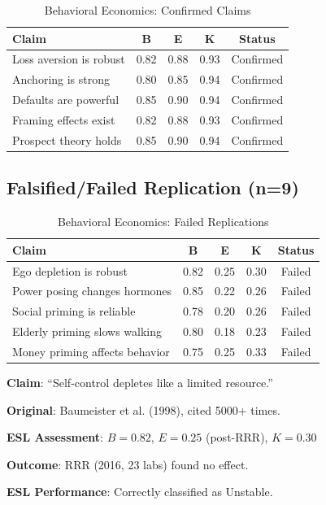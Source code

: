 \documentclass[11pt,a4paper]{article}
\theoremstyle{remark}
\begin{document}
\begin{table}[h]
\centering
\caption{Behavioral Economics: Confirmed Claims}
\begin{tabular}{p{5.5cm}cccc}
\toprule
\textbf{Claim} & \textbf{B} & \textbf{E} & \textbf{K} & \textbf{Status} \\
\midrule
Loss aversion is robust & 0.82 & 0.88 & 0.93 & Confirmed \\
Anchoring is strong & 0.80 & 0.85 & 0.94 & Confirmed \\
Defaults are powerful & 0.85 & 0.90 & 0.94 & Confirmed \\
Framing effects exist & 0.82 & 0.88 & 0.93 & Confirmed \\
Prospect theory holds & 0.85 & 0.90 & 0.94 & Confirmed \\
\bottomrule
\end{tabular}
\end{table}

\subsection{Falsified/Failed Replication (n=9)}

\begin{table}[h]
\centering
\caption{Behavioral Economics: Failed Replications}
\begin{tabular}{p{5.5cm}cccc}
\toprule
\textbf{Claim} & \textbf{B} & \textbf{E} & \textbf{K} & \textbf{Status} \\
\midrule
Ego depletion is robust & 0.82 & 0.25 & 0.30 & Failed \\
Power posing changes hormones & 0.85 & 0.22 & 0.26 & Failed \\
Social priming is reliable & 0.78 & 0.20 & 0.26 & Failed \\
Elderly priming slows walking & 0.80 & 0.18 & 0.23 & Failed \\
Money priming affects behavior & 0.75 & 0.25 & 0.33 & Failed \\
\bottomrule
\end{tabular}
\end{table}

\begin{examplebox}[title={Ego Depletion}]
\textbf{Claim}: ``Self-control depletes like a limited resource.''

\textbf{Original}: Baumeister et al. (1998), cited 5000+ times.

\textbf{ESL Assessment}: $B = 0.82$, $E = 0.25$ (post-RRR), $K = 0.30$

\textbf{Outcome}: RRR (2016, 23 labs) found no effect.

\textbf{ESL Performance}: Correctly classified as Unstable.
\end{examplebox}
\end{document}
